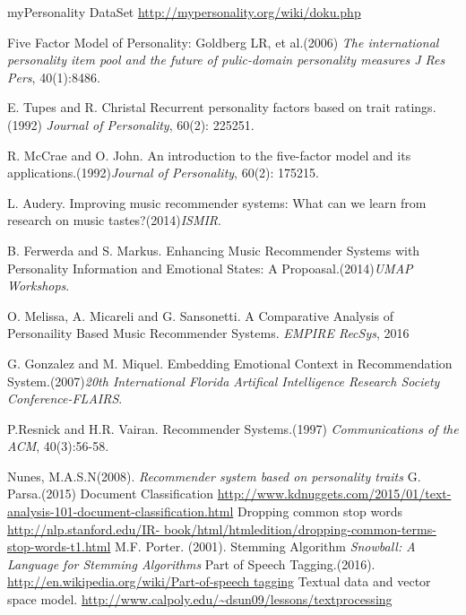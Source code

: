 
\newpage
{}
{}
\begin{thebibliography}{9}
		myPersonality DataSet \url{ http://mypersonality.org/wiki/doku.php}

	 Five Factor Model of Personality: Goldberg LR, et al.(2006) \textit{The international personality item pool and the future of pulic-domain personality measures J Res Pers}, 40(1):8486.

 E. Tupes and R. Christal Recurrent personality factors based on trait ratings.(1992) \textit{Journal of Personality}, 60(2): 225251.

 R. McCrae and O. John. An introduction to the five-factor model and its applications.(1992)\textit{Journal of Personality}, 60(2): 175215.

 L. Audery. Improving music recommender systems: What can we learn from research on music tastes?(2014)\textit{ISMIR}.

 B. Ferwerda and S. Markus. Enhancing Music Recommender Systems with Personality Information and Emotional States: A Propoasal.(2014)\textit{UMAP Workshops}.

	 O. Melissa, A. Micareli and G. Sansonetti. A Comparative Analysis of Personaility Based Music Recommender Systems. \textit{EMPIRE RecSys}, 2016

 G. Gonzalez and M. Miquel. Embedding Emotional Context in Recommendation System.(2007)\textit{20th International Florida Artifical Intelligence Research Society Conference-FLAIRS}.

 P.Resnick and H.R. Vairan. Recommender Systems.(1997) \textit{Communications of the ACM}, 40(3):56-58.

Nunes, M.A.S.N(2008). \textit{Recommender system based on personality traits}
	G. Parsa.(2015) Document Classification \url{http://www.kdnuggets.com/2015/01/text-analysis-101-document-classification.html}
	Dropping common stop words \url{http://nlp.stanford.edu/IR- book/html/htmledition/dropping-common-terms-stop-words-t1.html}
	M.F. Porter. (2001). Stemming Algorithm \textit{Snowball: A Language for Stemming Algorithms}
 Part of Speech Tagging.(2016). \url{http://en.wikipedia.org/wiki/Part-of-speech tagging}
Textual data and vector space model. \url{http://www.calpoly.edu/~dsun09/lessons/textprocessing}


\end{thebibliography}
